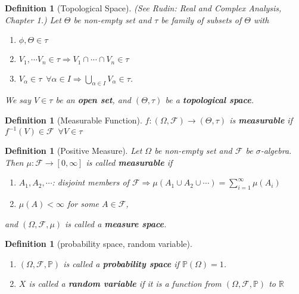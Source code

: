 \documentclass[12pt]{report}
\renewcommand{\1}{\mathbb{1}}
\theoremstyle{break}
\theoremstyle{newdef}
\newtheorem{defn}[thm]{Definition} %
\theoremstyle{remark}
\begin{document}
\begin{defn}[Topological Space]
(See Rudin: \textit{Real and Complex Analysis, Chapter 1.})
Let $\Theta$ be non-empty set and $\tau$ be family of subsets of $\Theta$ with
\begin{enumerate}
\item $\phi, \Theta \in \tau$
\item $V_1, \cdots V_n \in \tau \Rightarrow V_1 \cap \cdots \cap V_n \in \tau$
\item $V_\alpha \in \tau \enspace \forall \alpha \in I \Rightarrow \bigcup_{\alpha\in I}V_\alpha \in \tau$.
\end{enumerate}
We say $V\in\tau$ be an \textbf{open set}, and $(\Theta,\tau)$ be a \textbf{topological space}.
\end{defn}


\begin{defn}[Measurable Function]
$f : (\Omega, \mathcal{F}) \rightarrow (\Theta, \tau)$ is \textbf{measurable} if
$f^{-1}(V) \in \mathcal{F} \enspace \forall V \in \tau$
\end{defn}


\begin{defn}[Positive Measure]
Let $\Omega$ be non-empty set and $\mathcal{F}$ be $\sigma$-algebra.
Then $\mu: \mathcal{F} \rightarrow [0,\infty]$ is called \textbf{measurable} if
\begin{enumerate}
\item $A_1, A_2, \cdots$: disjoint members of $\mathcal{F} \Rightarrow \mu(A_1\cup A_2\cup \cdots) = \sum_{i=1}^\infty \mu(A_i)$
\item $\mu(A) < \infty$ for some $A \in \mathcal{F}$,
\end{enumerate}
and $(\Omega, \mathcal{F}, \mu)$ is called a \textbf{measure space}.
\end{defn}


\begin{defn}[probability space, random variable]
\leavevmode
\vspace{-6mm}
\begin{enumerate}
\item $(\Omega, \mathcal{F}, \mathbb{P})$ is called a \textbf{probability space} if $\mathbb{P}(\Omega) = 1$.
\item $X$ is called a \textbf{random variable} if it is a function from $(\Omega, \mathcal{F}, \mathbb{P})$ to $\mathbb{R}$
\end{enumerate}
\end{defn}
\end{document}
